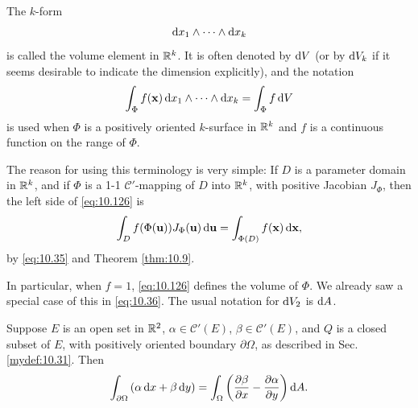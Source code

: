\begin{mydef}
    \label{mydef:10.44}
    The $k$-form 
    \begin{equation*}
        \d x_1 \wedge \cdots \wedge \d x_k
    \end{equation*}
    is called the volume element in ${\protect\mathbb R}^k$.
    It is often denoted by $\d V$
    (or by $\d V_k$ if it seems desirable to indicate the dimension explicitly),
    and the notation 
    \begin{equation}
        \label{eq:10.126}
        \int_{\Phi} f(\mathbf{x}) 
        \d x_1 \wedge \cdots \wedge \d x_k
        = \int_{\Phi} f \d V
    \end{equation}
    is used when $\Phi$ is a positively oriented $k$-surface in ${\protect\mathbb R}^k$ and $f$ is a continuous function on the range of $\Phi$.

    The reason for using this terminology is very simple: 
    If $D$ is a parameter domain in ${\protect\mathbb R}^k$, 
    and if $\Phi$ is a 1-1 $\mathscr{C}'$-mapping of $D$ into ${\protect\mathbb R}^k$, 
    with positive Jacobian $J_{\Phi}$, then the left side of \eqref{eq:10.126} is
    \begin{equation*}
        \int_D f (\Phi(\mathbf{u})) J_{\Phi}(\mathbf{u}) \d \mathbf{u} =
        \int_{\Phi(D)} f(\mathbf{x}) \d \mathbf{x},
    \end{equation*}
    by \eqref{eq:10.35} and Theorem \ref{thm:10.9}.
\end{mydef}

In particular, when $f= 1$, \eqref{eq:10.126} defines the volume of $\Phi$. 
We already saw a special case of this in \eqref{eq:10.36}.
The usual notation for $\d V_2$ is $\d A$.

\begin{mydef}
    \label{mydef:10.45}
    Suppose $E$ is an open set in ${\protect\mathbb R}^2$, $\alpha \in  \mathscr{C}'(E)$, $\beta \in  \mathscr{C}'(E)$,
    and $Q$ is a closed subset of $E$, with positively oriented boundary $\partial \Omega$, as described
    in Sec. \ref{mydef:10.31}. Then
    \begin{equation}
        \label{eq:10.127}
        \int_{\partial \Omega} \left( 
            \alpha \d x + \beta \d y 
            \right) = 
        \int_{\Omega} \left( 
            \frac{\partial \beta}{\partial x} -
            \frac{\partial \alpha}{\partial y} 
            \right) \d A .
    \end{equation}
\end{mydef}

